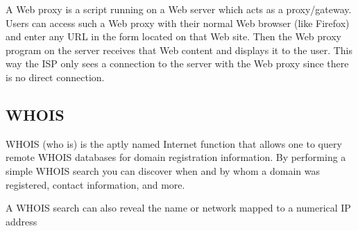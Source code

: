 A Web proxy is a script running on a Web server which acts as a
proxy/gateway. Users can access such a Web proxy with their normal Web
browser (like Firefox) and enter any URL in the form located on that Web
site. Then the Web proxy program on the server receives that Web content
and displays it to the user. This way the ISP only sees a connection to
the server with the Web proxy since there is no direct connection.

\subsection{WHOIS}

WHOIS (who is) is the aptly named Internet function that allows one to
query remote WHOIS databases for domain registration information. By
performing a simple WHOIS search you can discover when and by whom a
domain was registered, contact information, and more.

A WHOIS search can also reveal the name or network mapped to a numerical
IP address
